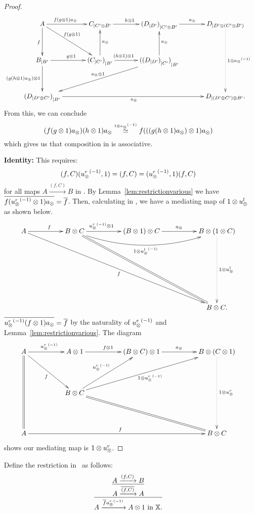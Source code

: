 \begin{proof}
  \[
    \xymatrix @C=35pt @R=35pt{
      A \ar[d]_f \ar[r]^(.4){f (g\*1) a_{\*}} \ar[dr]^(.4){f(g\*1)} &
        \xtdmn{C}{C' \* B'} \ar[r]^{h\*1}
        & \xtdmn{(\xtdmn{D}{D'})}{C' \* B'} \ar[r]^{a_{\*}}
        & \xtdmn{D}{D' \* (C' \* B')}
        \ar@{.>}[dd]^{1\*\inv{a_{\*}}}\\
      \xtdmn{B}{B'} \ar[d]_{(g (h\*1) a_{\*})\*1} \ar[r]^{g\*1}
        &\xtdmn{(\xtdmn{C}{C'})}{B'} \ar[u]_{a_{\*}} \ar[r]^(.4){(h\*1)\*1}
        & \xtdmn{(\xtdmn{(\xtdmn{D}{D'})}{C'})}{B'}
        \ar[u]_{a_\*} \ar[dll]_{a_{\*}\*1}
      \\
      \xtdmn{(\xtdmn{D}{D' \* C'})}{B'}  \ar[rrr]_{a_{\*}}
        &&& \xtdmn{D}{(D' \* C') \* B'}. %
    }
  \]
  From this, we can conclude
  \[
    (f(g\otimes1)a_{\otimes}) (h\otimes1)a_{\otimes} \overset{\scriptscriptstyle 1\otimes{a_{\otimes}}^{(-1)}}{\simeq} f (((g(h\otimes1)a_{\otimes})\otimes1) a_{\otimes})
  \]
  which gives us that composition in \Xt is associative.

  \textbf{Identity:} This requires:
  \[
    (f,C) ({u_{\otimes}^r}^{(-1)}, 1) = (f,C) = ({u_{\otimes}^r}^{(-1)}, 1) (f,C)
  \]
  for all maps $A\xrightarrow{(f,C)}B$ in \Xt.
  By Lemma~\ref{lem:restrictionvarious} we have
  $\overline{f ({u_{\otimes}^r}^{(-1)}\otimes1) a_{\otimes}} = \overline{f}$. Then, calculating in \X, we have a mediating map
  of $1 \otimes u_{\otimes}^l$ as shown below.
  \[
    \xymatrix @C=50pt @R=45pt{
      A \ar[r]^f \ar[ddrrr]_f&
        B \* C \ar[r]^(.4){\inv{\usr}\*1}
        \ar@/_20pt/[rr]_{1 \* \inv{\usl}}
        \ar@{=}[ddrr]
        & (B \* 1) \* C \ar[r]^{a_{\*}}
        & B \* (1 \* C) \ar@{.>}[dd]^{1 \* \usl} \\
      \\
      &&& B \* C.
    }
  \]
  $\overline{{u_{\otimes}^r}^{(-1)} (f \otimes1)  a_{\otimes}} = \overline{f}$ by the naturality of ${u_{\otimes}^r}^{(-1)}$ and
  Lemma~\ref{lem:restrictionvarious}. The diagram
  \[
    \xymatrix @C=50pt @R=45pt{
      A \ar@{=}[dd] \ar[r]^{\inv{\usr}} \ar[dr]_{f}
        &      A \* 1 \ar[r]^{f \* 1}
        & (B \* C) \* 1 \ar[r]^{a_{\*}}
        & B \* (C \* 1)\ar@{.>}[dd]^{1 \* \usr} \\
      &B\*C \ar[ur]^{\inv{\usr}} \ar[urr]_{1\*\inv{\usr}} \ar@{=}[drr]\\
      A \ar[rrr]^f &&& B \* C
    }
  \]
  shows our mediating map is $1 \otimes u_{\otimes}^r$.
\end{proof}


Define the restriction in \Xt\ as follows:
\[
  \infer{A\xrightarrow{\restr{f}  \inv{u_{\*}^r}} A\*1 \text{ in }\X.}
        {\infer{A\xrightarrow{\restr{(f,C)}}A}
               {A\xrightarrow{(f,C)}B}
        }
\]

